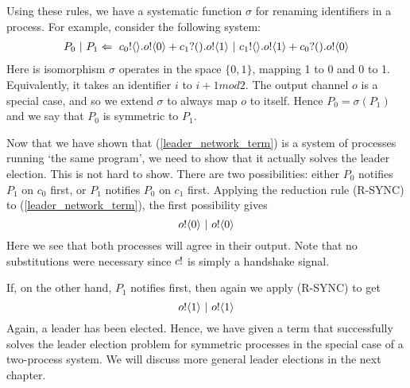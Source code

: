 Using these rules, we have a systematic function $\sigma$ for renaming identifiers in a process.
For example, consider the following system:
\begin{align}
	P_0\ |\  P_1 \Leftarrow\  {c_0}!\langle{}\rangle. {o}!\langle{0}\rangle + {c_1}?({}). {o}!\langle{1}\rangle \ |\  {c_1}!\langle{}\rangle. {o}!\langle{1}\rangle + {c_0}?({}). {o}!\langle{0}\rangle
	\label{leader_network_term}	
\end{align}
Here is isomorphism $\sigma$ operates in the space $\{0,1\}$, mapping 1 to 0 and 0 to 1.  
Equivalently, it takes an identifier $i$ to $i+1 mod 2$.
The output channel $o$ is a special case, and so we extend $\sigma$ to always map $o$ to itself.
Hence $P_0 = \sigma(P_1)$ and we say that $P_0$ is symmetric to $P_1$.

Now that we have shown that (\ref{leader_network_term}) is a system of processes running `the same program', we need to show that it actually solves the leader election.  This is not hard to show.  There are two possibilities: either $P_0$ notifies $P_1$ on $c_0$ first, or $P_1$ notifies $P_0$ on $c_1$ first.  Applying the reduction rule (R-SYNC) to (\ref{leader_network_term}), the first possibility gives
\[
	 {o}!\langle{0}\rangle \ |\  {o}!\langle{0}\rangle	
\]
Here we see that both processes will agree in their output.  Note that no substitutions were necessary since ${c}!{}$ is simply a handshake signal.

If, on the other hand, $P_1$ notifies first, then again we apply (R-SYNC) to get
\[
	{o}!\langle{1}\rangle \ |\  {o}!\langle{1}\rangle
\]
Again, a leader has been elected.
Hence, we have given a term that successfully solves the leader election problem for symmetric processes in the special case of a two-process system.  We will discuss more general leader elections in the next chapter.